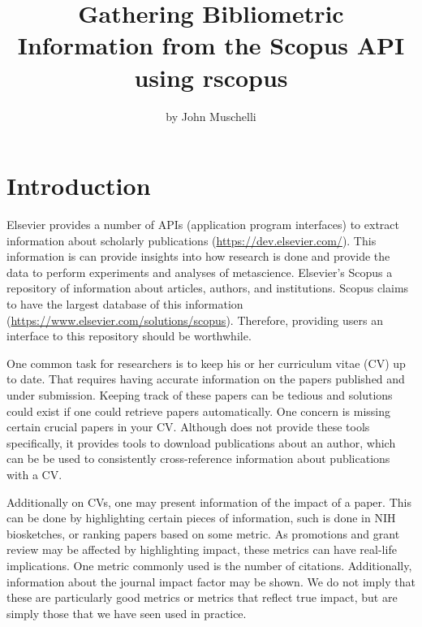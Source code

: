 \title{Gathering Bibliometric Information from the Scopus API using rscopus}
\author{by John Muschelli}

\maketitle



\hypertarget{introduction}{%
\section{Introduction}\label{introduction}}

Elsevier provides a number of APIs (application program interfaces) to
extract information about scholarly publications
(\url{https://dev.elsevier.com/}). This information is can provide
insights into how research is done and provide the data to perform
experiments and analyses of metascience. Elsevier's Scopus a repository
of information about articles, authors, and institutions. Scopus claims
to have the largest database of this information
(\url{https://www.elsevier.com/solutions/scopus}). Therefore, providing
users an interface to this repository should be worthwhile.

One common task for researchers is to keep his or her curriculum vitae
(CV) up to date. That requires having accurate information on the papers
published and under submission. Keeping track of these papers can be
tedious and solutions could exist if one could retrieve papers
automatically. One concern is missing certain crucial papers in your CV.
Although  does not provide these tools specifically, it
provides tools to download publications about an author, which can be be
used to consistently cross-reference information about publications with
a CV.

Additionally on CVs, one may present information of the impact of a
paper. This can be done by highlighting certain pieces of information,
such is done in NIH biosketches, or ranking papers based on some metric.
As promotions and grant review may be affected by highlighting impact,
these metrics can have real-life implications. One metric commonly used
is the number of citations. Additionally, information about the journal
impact factor may be shown. We do not imply that these are particularly
good metrics or metrics that reflect true impact, but are simply those
that we have seen used in practice.\\

